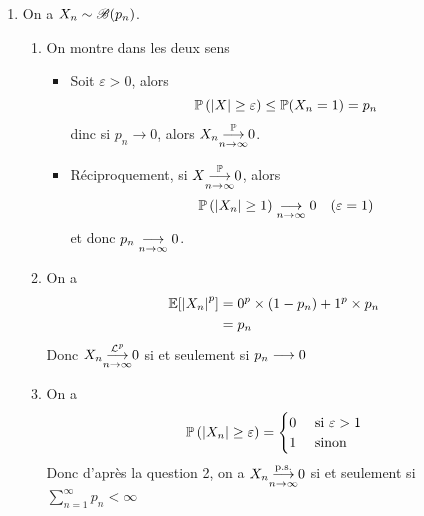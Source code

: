 {\begin{td-sol}[]
\begin{enumerate}
            \item On a \(X_n\sim\mathscr{B}(p_n)\).
            \begin{enumerate}
                \item On montre dans les deux sens
                \begin{itemize}[\ptr{}]
                    \item Soit \(\varepsilon>0\), alors
                    \begin{equation*}
                        \mathbb{P}\left(|X|\geq \varepsilon\right)\leq \mathbb{P}(X_n=1)=p_n
                    \end{equation*}
                    dinc si \(p_n\to 0\), alors \(X_n\underset{n\to\infty}{{\overset{\mathbb{P}}{\longrightarrow}}}0\).

                    \item Réciproquement, si \(X\underset{n\to\infty}{{\overset{\mathbb{P}}{\longrightarrow}}}0\), alors
                    \begin{equation*}
                        \mathbb{P}\left(|X_n|\geq 1\right)\underset{n\to\infty}{\longrightarrow} 0\quad (\varepsilon=1)
                    \end{equation*}
                    et donc \(p_n\underset{n\to\infty}{\longrightarrow} 0\).
                \end{itemize}

                \item On a
                \begin{equation*}
                    \begin{aligned}
                        \mathbb{E} \mathopen{}\left[{\mathopen{}\left|X_n\right|\mathclose{}}^p\right]\mathclose{}
                        &= 0^p\times (1-p_n) + 1^p \times p_n\\
                        &= p_n
                    \end{aligned}
                \end{equation*}
                Donc \(X_n \underset{n\to\infty}{{\overset{\mathcal{L}^{p}}{\longrightarrow}}} 0\) si et seulement si \(p_n\longrightarrow0\)

                \item On a
                \begin{equation*}
                    \mathbb{P}\left(\mathopen{}\left|X_n\right|\mathclose{}\geq\varepsilon\right)=
                    \begin{cases}
                        0&\text{ si }\varepsilon>1\\
                        1&\text{ sinon}
                    \end{cases}
                \end{equation*}
                Donc d'après la question 2, on a \(X_n\underset{n\to\infty}{{\overset{\text{p.s.}}{\longrightarrow}}}0\) si
                et seulement si \(\sum_{n=1}^{\infty}p_n<\infty\)
            \end{enumerate}


\end{enumerate}
\end{td-sol}}
